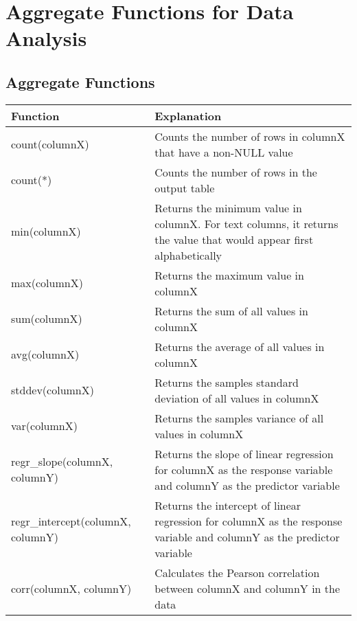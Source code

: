\chapter{Aggregate Functions for Data Analysis\label{Ch04}}
\section{Aggregate Functions}
\begin{table}
    \centering
    \begin{tabularx}{\textwidth}{lX}
        \hline
        Function                          & Explanation                                                                                                           \\
        \hline
        count(columnX)                    & Counts the number of rows in columnX that have a non-NULL value                                                       \\
        count(*)                          & Counts the number of rows in the output table                                                                         \\
        min(columnX)                      & Returns the minimum value in columnX. For text columns, it returns the value that would appear first alphabetically   \\
        max(columnX)                      & Returns the maximum value in columnX                                                                                  \\
        sum(columnX)                      & Returns the sum of all values in columnX                                                                              \\
        avg(columnX)                      & Returns the average of all values in columnX                                                                          \\
        stddev(columnX)                   & Returns the samples standard deviation of all values in columnX                                                       \\
        var(columnX)                      & Returns the samples variance of all values in columnX                                                                 \\
        regr\_slope(columnX, columnY)     & Returns the slope of linear regression for columnX as the response variable and columnY as the predictor variable     \\
        regr\_intercept(columnX, columnY) & Returns the intercept of linear regression for columnX as the response variable and columnY as the predictor variable \\
        corr(columnX, columnY)            & Calculates the Pearson correlation between columnX and columnY in the data                                            \\
        \hline
    \end{tabularx}
\end{table}